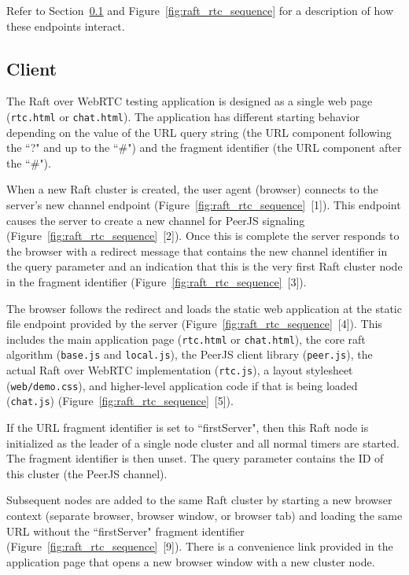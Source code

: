 \documentclass[conference,compsoc]{./IEEEtran/IEEEtran}
\begin{document}
Refer to Section~\ref{section:design-client} and
Figure~\ref{fig:raft_rtc_sequence} for a description of how these
endpoints interact.

\subsection{Client}
    \label{section:design-client}

The Raft over WebRTC testing application is designed as a single web
page (\texttt{rtc.html} or \texttt{chat.html}). The application has
different starting behavior depending on the value of the URL query
string (the URL component following the ``?" and up to the ``\#") and
the fragment identifier (the URL component after the ``\#").

When a new Raft cluster is created, the user agent (browser) connects
to the server's new channel endpoint
(Figure~\ref{fig:raft_rtc_sequence}~[1]). This endpoint causes the
server to create a new channel for PeerJS signaling
(Figure~\ref{fig:raft_rtc_sequence}~[2]). Once this is complete the
server responds to the browser with a redirect message
that contains the new channel identifier in the query parameter and an
indication that this is the very first Raft cluster node in the
fragment identifier (Figure~\ref{fig:raft_rtc_sequence}~[3]).

The browser follows the redirect and loads the static web application
at the static file endpoint provided by the server
(Figure~\ref{fig:raft_rtc_sequence}~[4]). This includes the
main application page (\texttt{rtc.html} or \texttt{chat.html}), the
core raft algorithm (\texttt{base.js} and \texttt{local.js}), the
PeerJS client library (\texttt{peer.js}), the actual Raft over WebRTC
implementation (\texttt{rtc.js}), a layout stylesheet
(\texttt{web/demo.css}), and higher-level application code if that is
being loaded (\texttt{chat.js})
(Figure~\ref{fig:raft_rtc_sequence}~[5]).

If the URL fragment identifier is set to ``firstServer", then this Raft
node is initialized as the leader of a single node cluster and all
normal timers are started. The fragment identifier is then unset. The
query parameter contains the ID of this cluster (the PeerJS channel).

Subsequent nodes are added to the same Raft cluster by starting a new
browser context (separate browser, browser window, or browser tab) and
loading the same URL without the ``firstServer" fragment identifier
(Figure~\ref{fig:raft_rtc_sequence}~[9]). There is a convenience link
provided in the application page that opens a new browser window with
a new cluster node.  %
\end{document}
